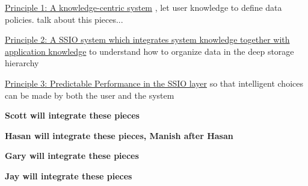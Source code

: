 \underline{Principle 1: A knowledge-centric system} , let user knowledge  to define data policies. talk about this pieces...

\underline{Principle 2: A SSIO system which integrates system knowledge together with application knowledge} to understand
how to organize data in the deep storage hierarchy

\underline{Principle 3: Predictable Performance in the SSIO layer} so that intelligent choices can be made by both the user and the system



%

{\bf {\color{red}Scott will integrate these pieces}}



%
{\bf {\color{red}Hasan will integrate these pieces, Manish after Hasan}}




%
%


{\bf {\color{red}Gary will integrate these pieces}}


%
{\bf {\color{red}Jay  will integrate these pieces}}

% 




